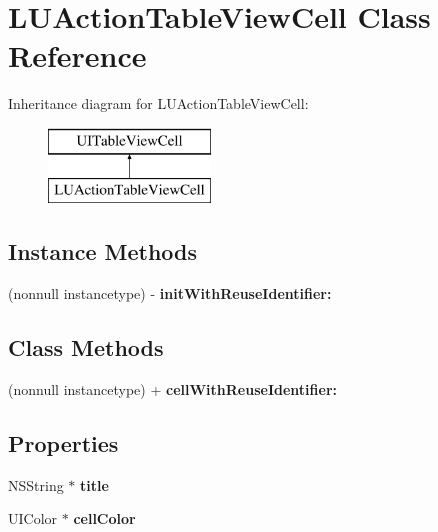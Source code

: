 \hypertarget{interface_l_u_action_table_view_cell}{}\section{L\+U\+Action\+Table\+View\+Cell Class Reference}
\label{interface_l_u_action_table_view_cell}
Inheritance diagram for L\+U\+Action\+Table\+View\+Cell\+:\begin{figure}[H]
\begin{center}
\leavevmode
\includegraphics[height=2.000000cm]{interface_l_u_action_table_view_cell}
\end{center}
\end{figure}
\subsection*{Instance Methods}
\begin{DoxyCompactItemize}
\item 
\mbox{\label{interface_l_u_action_table_view_cell_a77b5edb8cd466c6ac868ceb77dd4f2f0}} 
(nonnull instancetype) -\/ {\bfseries init\+With\+Reuse\+Identifier\+:}
\end{DoxyCompactItemize}
\subsection*{Class Methods}
\begin{DoxyCompactItemize}
\item 
\mbox{\label{interface_l_u_action_table_view_cell_a42d1ee9bb1b5957848bbfea91f2513c0}} 
(nonnull instancetype) + {\bfseries cell\+With\+Reuse\+Identifier\+:}
\end{DoxyCompactItemize}
\subsection*{Properties}
\begin{DoxyCompactItemize}
\item 
\mbox{\label{interface_l_u_action_table_view_cell_a4dc53b6b46c86acbc2b3f5bd358467d2}} 
N\+S\+String $\ast$ {\bfseries title}
\item 
\mbox{\label{interface_l_u_action_table_view_cell_a5b033cedde181b93aa1fde0eecbdebf6}} 
U\+I\+Color $\ast$ {\bfseries cell\+Color}
\end{DoxyCompactItemize}



